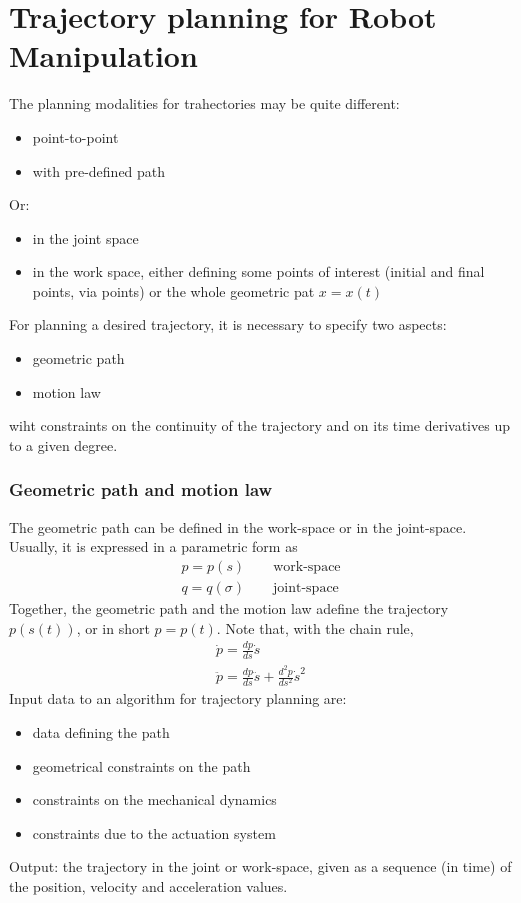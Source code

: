 \documentclass{book}
\begin{document}
\chapter{Trajectory planning for Robot Manipulation}
The planning modalities for trahectories may be quite different: 
\begin{itemize}
    \item point-to-point 
    \item with pre-defined path 
\end{itemize}
Or:
\begin{itemize}
    \item in the joint space
    \item  in the work space, either defining some points of interest (initial and final points, via points) or the whole geometric pat $x=x(t)$
\end{itemize}
For planning a desired trajectory, it is necessary to specify two aspects:
\begin{itemize}
    \item geometric path 
    \item motion law 
\end{itemize}
wiht constraints on the continuity of the trajectory and on its time derivatives up to a given degree. 

\subsection{Geometric path and motion law}
The geometric path can be defined in the work-space or in the joint-space. Usually, it is expressed in a parametric form as 
\begin{gather*}
    p=p(s) \qquad \text{work-space}\\
    q=q(\sigma)\qquad \text{joint-space}
\end{gather*}
Together, the geometric path and the motion law adefine the trajectory $p(s(t))$, or in short  $p=p(t)$. Note that, with the chain rule, 
\begin{gather*}
    \dot{p}=\displaystyle\frac{dp}{ds}\dot{s}\\
    \ddot{p}=\displaystyle\frac{dp}{ds}\ddot{s}+\displaystyle\frac{d^2p}{ds^2}\dot{s}^2
\end{gather*}
Input data to an algorithm for trajectory planning are: 
\begin{itemize}
    \item data defining the path 
    \item geometrical constraints on the path 
    \item constraints on the mechanical dynamics 
    \item constraints due to the actuation system 
\end{itemize}
Output: the trajectory in the joint or work-space, given as a sequence (in time) of the position, velocity and acceleration values. 
\end{document}
